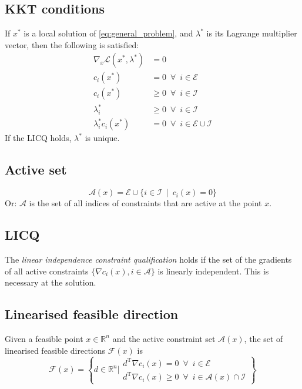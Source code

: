 \documentclass[a4paper, 12pt]{article}
\theoremstyle{definition}
\newcommand{\T}{^{\scriptscriptstyle \text{T}}}
\newcommand{\lagrange}{\mathcal{L}}
\newcommand{\Econ}{\mathcal{E}}
\newcommand{\Icon}{\mathcal{I}}
\newcommand{\enforall}{\enspace \forall \enspace}
\begin{document}
\subsection{KKT conditions}
If \( x^* \) is a local solution of \eqref{eq:general_problem}, and \( \lambda^* \) is its Lagrange multiplier vector, then the following is satisfied:
\begin{subequations}
	\begin{align}
		\nabla_x \lagrange(x^*, \lambda^*) &= 0                                                \\
		c_i(x^*)                           &= 0 \enforall i \in \Econ                          \\
		c_i(x^*)                           &\geq 0 \enforall i \in \Icon                       \\
		\lambda_i^*                        &\geq 0 \enforall i \in \Icon \label{eq:KKT_lambda} \\
		\lambda_i^* c_i(x^*)               &= 0 \enforall i \in \Econ \cup \Icon
	\end{align}
\end{subequations}
If the LICQ holds, \( \lambda^* \) is unique.

\subsection{Active set}
\begin{equation}
	\mathcal{A}(x) = \Econ \cup \{ i \in \Icon \enspace | \enspace c_i(x) = 0 \}
\end{equation}
Or: \(\mathcal{A}\) is the set of all indices of constraints that are active at the point \(x\).

\subsection{LICQ}
The \emph{linear independence constraint qualification} holds if the set of the gradients of all active constraints \(\{ \nabla c_i(x), i \in \mathcal{A} \}\) is linearly independent. This is necessary at the solution.

\subsection{Linearised feasible direction}
Given a feasible point \(x \in \mathbb{R}^n\) and the active constraint set \(\mathcal{A}(x)\), the set of linearised feasible directions \(\mathcal{F}(x)\) is
\begin{equation}
	\mathcal{F}(x) = \left\{ d \in \mathbb{R}^n \biggr\rvert
	\begin{array}{l}
		d\T \nabla c_i(x) = 0 \enforall i \in \Econ \\
		d\T \nabla c_i(x) \geq 0 \enforall i \in \mathcal{A}(x) \cap \Icon
	\end{array}
	\right\}
\end{equation}
\end{document}
